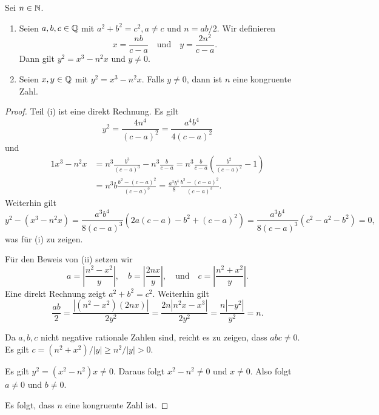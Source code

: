 \begin{lemma} \label{lem:congruentelliptic}
  Sei $n\in{\mathbb{N}}$. 
  \begin{enumerate}
  \item
  Seien $a,b,c\in {\mathbb{Q}}$ mit $a^2+b^2=c^2,a\not=c$ und $n = ab/2$. Wir definieren
  \begin{equation*}
    x = \frac{nb}{c-a} \quad\text{und}\quad
    y = \frac{2n^2}{c-a}. 
  \end{equation*}
  Dann gilt $y^2 = x^3-n^2 x$ und $y\not=0$.
  \item Seien $x,y\in{\mathbb{Q}}$ mit $y^2 = x^3-n^2x$. Falls $y\not=0$, dann
    ist $n$ eine kongruente Zahl.
  \end{enumerate}
\end{lemma}
\begin{proof}
  Teil (i) ist eine direkt Rechnung. Es gilt
  \begin{equation*}
    y^2 = \frac{4n^4}{(c-a)^2} = \frac{a^4b^4}{4(c-a)^2} 
  \end{equation*}
  und
  \begin{alignat*}1
    x^3 -n^2 x &= n^3 \frac{b^3}{(c-a)^3} - n^3 \frac{b}{c-a}
    = n^3 \frac{b}{c-a}\left(\frac{b^2}{(c-a)^2}-1\right)\\
    &= n^3 b\frac{b^2-(c-a)^2}{(c-a)^3}
    = \frac{a^3b^4}{8}\frac{b^2-(c-a)^2}{(c-a)^3}.
  \end{alignat*}
  Weiterhin gilt  $$
  y^2 - (x^3-n^2x) = \frac{a^3b^4}{8(c-a)^3} \left(
    2a(c-a) - b^2+(c-a)^2\right) =
  \frac{a^3b^4}{8(c-a)^3} (c^2-a^2-b^2)=0,
  $$
  was für (i)  zu zeigen.

  Für den Beweis von (ii) setzen wir
  \begin{equation}
    \label{eq:abcvonnxy}
    a = \left|\frac{n^2-x^2}{y}\right|, \quad
    b = \left|\frac{2nx}{y}\right|, \quad\text{und}\quad
    c = \left|\frac{n^2+x^2}{y}\right|. 
  \end{equation}
  Eine direkt Rechnung zeigt $a^2+b^2=c^2$. Weiterhin gilt
  \begin{equation*}
    \frac{ab}{2} = \frac{|(n^2-x^2)(2nx)|}{2y^2} = \frac{2n |n^2x -
      x^3|}{2y^2} = \frac{n |-y^2|}{y^2} = n.
  \end{equation*}

  Da $a,b,c$ nicht negative rationale Zahlen sind, reicht es zu
  zeigen, dass $abc\not=0$. Es gilt $c = (n^2+x^2)/|y| \ge n^2/|y|>0$.

  Es gilt $y^2 = (x^2-n^2)x\not=0$. Daraus folgt 
  $x^2-n^2\not=0$ und $x\not=0$. Also folgt $a\not=0$ und $b\not=0$. 

  Es folgt, dass $n$ eine kongruente Zahl ist. 
\end{proof}

